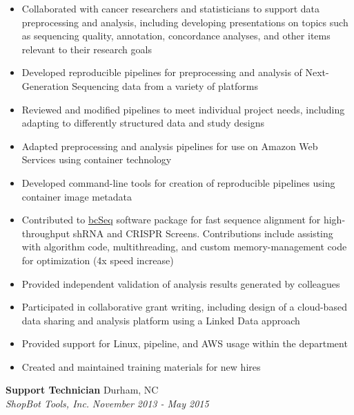 \documentclass[10pt]{article}
\begin{document}
\begin{itemize}
\setlength{\itemsep}{0pt}

\item Collaborated with cancer researchers and statisticians to support data preprocessing and analysis, including developing presentations on topics such as sequencing quality, annotation, concordance analyses, and other items relevant to their research goals

\item Developed reproducible pipelines for preprocessing
  and analysis of Next-Generation Sequencing data
  from a variety of platforms

\item Reviewed and modified pipelines to meet individual project needs, including adapting to differently structured data and study designs
  
\item Adapted preprocessing and analysis pipelines for use on
 Amazon Web Services using container technology

\item Developed command-line tools for creation of reproducible pipelines
  using container image metadata
  
\item Contributed to \href{https://github.com/jl354/bcSeq}{bcSeq} software
    package for fast sequence alignment for high-throughput shRNA and CRISPR Screens. Contributions include assisting with algorithm code, multithreading, and custom memory-management code for optimization (4x speed increase)

\item Provided independent validation of analysis results generated by colleagues

\item Participated in collaborative grant writing, including design of a cloud-based data sharing and analysis platform using a Linked Data approach
  
\item Provided support for Linux, pipeline, and AWS usage within the department
  
\item Created and maintained training materials for new hires
 
\end{itemize}
\break

\noindent
{\bf Support Technician} \hfill Durham, NC\\
{\it ShopBot Tools, Inc.} \hfill {\it November 2013 - May 2015}
\end{document}
